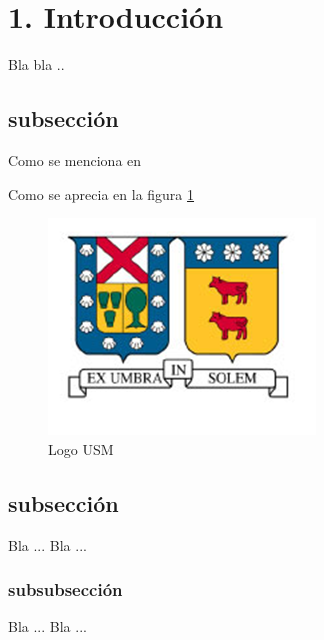 \section{1. Introducción}
Bla bla ..

\subsection{subsección}

Como se menciona en \cite{method}\cite{modnegweb}\cite{modnegweb2}

Como se aprecia en la figura \ref{usm}

\begin{figure}[H]
\centering
\includegraphics[scale=1]{fig/usmLogo}
\caption{Logo USM}
\label{usm}
\end{figure}

\subsection{subsección}
Bla ...  Bla ...

\subsubsection{subsubsección}
Bla ... Bla ...
